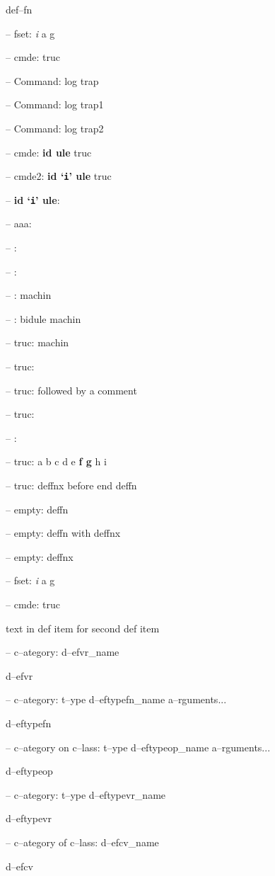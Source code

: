 \documentclass{book}
\begin{document}
def--fn


\hbox{}-- fset: \emph{i} a g


\hbox{}-- cmde: truc 


\hbox{}-- Command: log trap 


\hbox{}-- Command: log trap1 


\hbox{}-- Command: log trap2 


\hbox{}-- cmde: \textbf{id ule} truc


\hbox{}-- cmde2: \textbf{id `\texttt{i}' ule} truc


\hbox{}-- \textbf{id `\texttt{i}' ule}: 



\hbox{}-- aaa: 


\hbox{}-- : 


\hbox{}-- : 


\hbox{}-- : machin


\hbox{}-- : bidule machin


\hbox{}-- truc: machin


\hbox{}-- truc: 


\hbox{}-- truc: followed by a comment


\hbox{}-- truc: 


\hbox{}-- : 


\hbox{}-- truc: a b c d e \textbf{f g} h i


\hbox{}-- truc: deffnx before end deffn


\hbox{}-- empty: deffn


\hbox{}-- empty: deffn with deffnx


\hbox{}-- empty: deffnx


\hbox{}-- fset: \emph{i} a g


\hbox{}-- cmde: truc 


text in def item for second def item


\hbox{}-- c--ategory: d--efvr\_name


d--efvr


\hbox{}-- c--ategory: t--ype d--eftypefn\_name a--rguments...


d--eftypefn


\hbox{}-- c--ategory on c--lass: t--ype d--eftypeop\_name a--rguments...


d--eftypeop


\hbox{}-- c--ategory: t--ype d--eftypevr\_name


d--eftypevr


\hbox{}-- c--ategory of c--lass: d--efcv\_name


d--efcv
\end{document}
